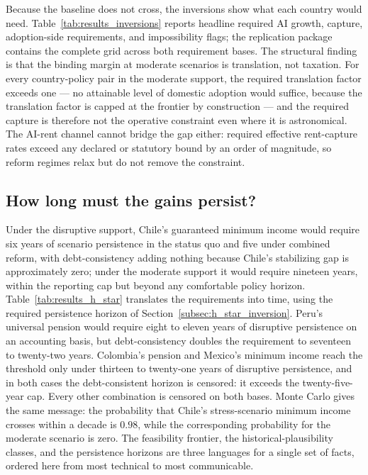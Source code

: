 \documentclass[11pt,a4paper]{article}
\begin{document}
Because the baseline does not cross, the inversions show what each country would need.
Table~\ref{tab:results_inversions} reports headline required AI growth, capture, adoption-side
requirements, and impossibility flags; the replication package contains the complete grid
across both requirement bases.
The structural finding is that the binding margin at moderate scenarios is translation, not
taxation. For every country-policy pair in the moderate support, the required translation
factor exceeds one --- no attainable level of domestic adoption would suffice, because the
translation factor is capped at the frontier by construction --- and the required capture is
therefore not the operative constraint even where it is astronomical. The AI-rent channel
cannot bridge the gap either: required effective rent-capture rates exceed any declared or
statutory bound by an order of magnitude, so reform regimes relax but do not remove the
constraint.



\subsection{How long must the gains persist?}

Under the disruptive support, Chile's guaranteed minimum income would require six years of scenario persistence
in the status quo and five under combined reform, with debt-consistency adding nothing
because Chile's stabilizing gap is approximately zero; under the moderate support it would
require nineteen years, within the reporting cap but beyond any comfortable policy horizon.
Table~\ref{tab:results_h_star} translates the requirements into time, using the required
persistence horizon of Section~\ref{subsec:h_star_inversion}. Peru's universal pension would require eight to eleven years of disruptive persistence on an
accounting basis, but debt-consistency doubles the requirement to seventeen to twenty-two
years. Colombia's pension and Mexico's minimum income reach the threshold only under
thirteen to twenty-one years of disruptive persistence, and in both cases the
debt-consistent horizon is censored: it exceeds the twenty-five-year cap. Every other
combination is censored on both bases. Monte Carlo gives the same message:
the probability that Chile's stress-scenario minimum income crosses within a decade is
$0.98$, while the corresponding probability for the moderate scenario is zero. The
feasibility frontier, the historical-plausibility classes, and the persistence horizons are
three languages for a single set of facts, ordered here from most technical to most
communicable.

\end{document}
